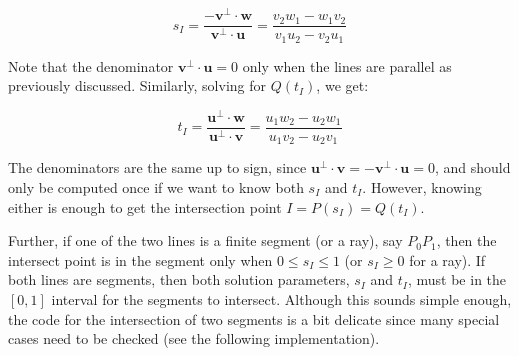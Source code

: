\documentclass[12pt]{article}
\begin{document}
\[ 
  s_I = \frac{-\pmb{v}^\perp \cdot \pmb{w}}{\pmb{v}^\perp \cdot \pmb{u}} 
      =  \frac{v_2w_1 - w_1v_2}{v_1u_2 - v_2u_1}
\]

Note that the denominator $\pmb{v}^\perp \cdot \pmb{u}=0$ only when the lines are parallel 
as previously discussed. Similarly, solving for $Q(t_I)$, we get:

\[
  t_I = \frac{\pmb{u}^\perp \cdot \pmb{w}}{\pmb{u}^\perp \cdot \pmb{v}} 
  = \frac{u_1w_2 - u_2w_1}{u_1v_2 - u_2v_1}  
\]

The denominators are the same up to sign, since 
$\pmb{u}^\perp \cdot \pmb{v}=-\pmb{v}^\perp \cdot \pmb{u}=0$, 
and should only be computed once if we want to know both $s_I$ and $t_I$. 
However, knowing either is enough to get the intersection point 
$I = P(s_I) = Q(t_I)$.

Further, if one of the two lines is a finite segment (or a ray), 
say $P_0P_1$, then the intersect point is in the segment only when 
$0\leq s_I \leq 1$ (or $s_I \geq 0$ for a ray). If both lines are segments, 
then both solution parameters, $s_I$ and $t_I$, must be in the $[0,1]$ 
interval for the segments to intersect. Although this sounds simple 
enough, the code for the intersection of two segments is a bit 
delicate since many special cases need to be checked (see the following implementation).
\end{document}
